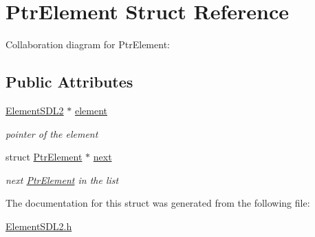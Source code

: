 \hypertarget{structPtrElement}{}\section{Ptr\+Element Struct Reference}
\label{structPtrElement}


Collaboration diagram for Ptr\+Element\+:
\subsection*{Public Attributes}
\begin{DoxyCompactItemize}
\item 
\hyperlink{structElementSDL2}{Element\+S\+D\+L2} $\ast$ \hyperlink{structPtrElement_ab98d72210e939fbe5de20d8a53bc3ddf}{element}\hypertarget{structPtrElement_ab98d72210e939fbe5de20d8a53bc3ddf}{}\label{structPtrElement_ab98d72210e939fbe5de20d8a53bc3ddf}

\begin{DoxyCompactList}\small\item\em pointer of the element \end{DoxyCompactList}\item 
struct \hyperlink{structPtrElement}{Ptr\+Element} $\ast$ \hyperlink{structPtrElement_a47ef3a7e16db4568be2fbef257873a07}{next}\hypertarget{structPtrElement_a47ef3a7e16db4568be2fbef257873a07}{}\label{structPtrElement_a47ef3a7e16db4568be2fbef257873a07}

\begin{DoxyCompactList}\small\item\em next \hyperlink{structPtrElement}{Ptr\+Element} in the list \end{DoxyCompactList}\end{DoxyCompactItemize}


The documentation for this struct was generated from the following file\+:\begin{DoxyCompactItemize}
\item 
\hyperlink{ElementSDL2_8h}{Element\+S\+D\+L2.\+h}\end{DoxyCompactItemize}
